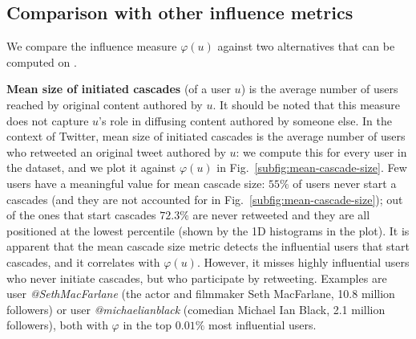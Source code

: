 \subsection{Comparison with other influence metrics}
\label{subsec:two-alternatives}

We compare the influence measure $\varphi(u)$ against two alternatives that can be computed on \debate.


\textbf{Mean size of initiated cascades} (of a user $u$) is the average number of users reached by original content authored by $u$.
It should be noted that this measure does not capture $u$'s role in diffusing content authored by someone else.
In the context of Twitter, mean size of initiated cascades is the average number of users who retweeted an original tweet authored by $u$: we compute this for every user in the \debate dataset, and we plot it against $\varphi(u)$ in Fig.~\ref{subfig:mean-cascade-size}.
Few users have a meaningful value for mean cascade size: 
$55\%$ of users never start a cascades (and they are not accounted for in Fig.~\ref{subfig:mean-cascade-size}); 
out of the ones that start cascades $72.3\%$ are never retweeted and they are all positioned at the lowest percentile (shown by the 1D histograms in the plot).
%
It is apparent that the mean cascade size metric detects the influential users that start cascades, and it correlates with $\varphi(u)$.
However, it misses highly influential users who never initiate cascades, but who participate by retweeting. Examples are user \textit{@SethMacFarlane} (the actor and filmmaker Seth MacFarlane, 10.8 million followers) or user \textit{@michaelianblack} (comedian Michael Ian Black, 2.1 million followers), both with $\varphi$ in the top $0.01\%$ most influential users.

